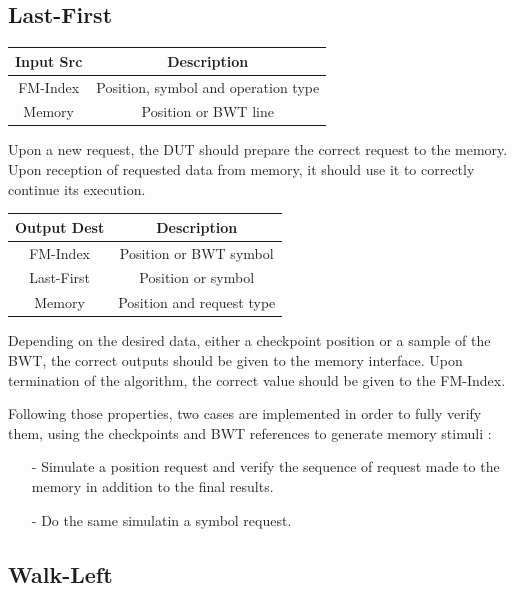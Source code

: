\subsection{Last-First}

\vspace*{3mm}
\begin{center}
    \begin{tabular}{|c|c|}
\hline
  Input Src   &  Description \\
  \hline
   FM-Index  & Position, symbol and operation type \\
   Memory & Position or BWT line \\
   \hline
\end{tabular}
\end{center}
\vspace*{5mm}

Upon a new request, the DUT should prepare the correct request to the memory. Upon reception of requested data from memory, it should use it to correctly continue its execution.

\begin{center}
\begin{tabular}{|c|c|}
\hline
  Output Dest   &  Description \\
  \hline
   FM-Index  & Position or BWT symbol \\
   Last-First & Position or symbol \\
   Memory & Position and request type \\
   \hline
\end{tabular}
\end{center}

Depending on the desired data, either a checkpoint position or a sample of the BWT, the correct outputs should be given to the memory interface. Upon termination of the algorithm, the correct value should be given to the FM-Index.

Following those properties, two cases are implemented in order to fully verify them, using the checkpoints and BWT references to generate memory stimuli :
\begin{itemize}
    \item [-] Simulate a position request and verify the sequence of request made to the memory in addition to the final results. 
    \item [-] Do the same simulatin a symbol request.
\end{itemize}
\subsection{Walk-Left}


